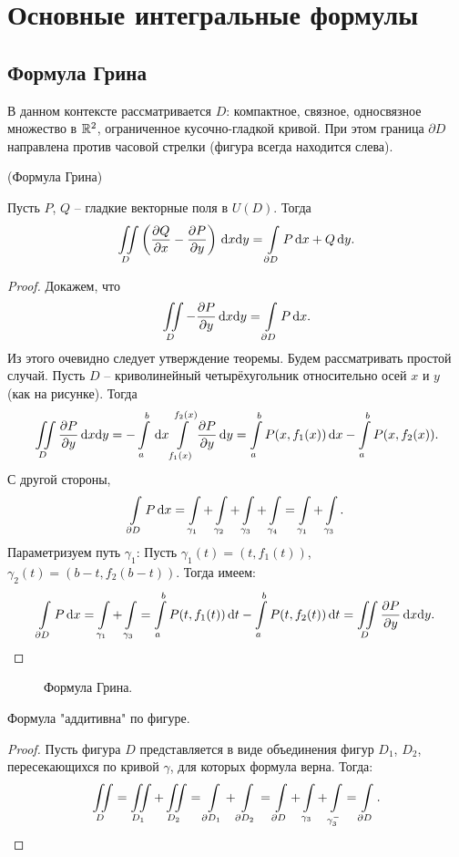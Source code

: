 \chapter{Основные интегральные формулы}
\section{Формула Грина}

\begin{remark}
     В данном контексте рассматривается $D$: компактное, связное,
     односвязное множество в $\mathbb{R}^2$, ограниченное кусочно-гладкой кривой.
     При этом граница $\partial D$ направлена против часовой стрелки 
     (фигура всегда находится слева).
\end{remark}

\begin{theorem}(Формула Грина)

    Пусть $P$, $Q$ -- гладкие векторные поля в $U(D)$. Тогда
\[
    \iint\limits_{D}{\left( \dfrac{\partial Q}{\partial x} - \dfrac{\partial P}{\partial y} \right) \,\mathrm{d} x \mathrm{d} y}
    = \int\limits_{\partial D}{P \,\mathrm{d} x + Q \,\mathrm{d} y}
.\] 
\end{theorem}
\begin{proof}
    Докажем, что 
    \[
        \iint\limits_D{-\dfrac{\partial P}{\partial y} \,\mathrm{d} x \mathrm{d} y} = \int\limits_{\partial D}{P \,\mathrm{d} x}
    .\]
    Из этого очевидно следует утверждение теоремы.
    Будем рассматривать простой случай. Пусть $D$ -- криволинейный четырёхугольник относительно
    осей $x$ и $y$ (как на рисунке). Тогда
    \[
        \iint\limits_D{\dfrac{\partial P}{\partial y} \,\mathrm{d} x \mathrm{d} y} = -\int\limits_a^b{\,\mathrm{d} x \int\limits_{f_1(x)}^{f_2(x)}
        {\dfrac{\partial P}{\partial y} \,\mathrm{d} y}} = \int\limits_a^b{P(x, f_1(x)) \,\mathrm{d} x} - \int\limits_a^b{P(x, f_2(x))}
    .\]
    С другой стороны,
    \[
        \int\limits_{\partial D}{P \,\mathrm{d} x} = \int\limits_{\gamma_1} + \int\limits_{\gamma_2} + \int\limits_{\gamma_3}
        + \int\limits_{\gamma_4} = \int\limits_{\gamma_1} + \int\limits_{\gamma_3}
    .\]
    Параметризуем путь $\gamma_1$: Пусть $\gamma_1(t) = (t, f_1(t))$, $\gamma_2(t) = (b - t, f_2(b - t))$.
    Тогда имеем:
    \[
        \int\limits_{\partial D}{P \,\mathrm{d} x} = \int\limits_{\gamma_1} + \int\limits_{\gamma_3} =
        \int\limits_a^b{P(t, f_1(t)) \,\mathrm{d} t} - \int\limits_a^b{P(t, f_2(t)) \,\mathrm{d} t} =
        \iint\limits_{D}{\dfrac{\partial P}{\partial y} \,\mathrm{d} x \mathrm{d} y}
    .\]
\end{proof}

\begin{figure}[h!]
    \centering
    \caption{Формула Грина.}
\end{figure}

\begin{remark}
    Формула "аддитивна" по фигуре.
\end{remark}
\begin{proof}
    Пусть фигура $D$ представляется в виде объединения фигур $D_1$, $D_2$, пересекающихся
    по кривой $\gamma$, для которых формула верна. Тогда:
    \[
        \iint\limits_{D} = \iint\limits_{D_1} + \iint\limits_{D_2} = \int\limits_{\partial D_1} + \int\limits_{\partial D_2} =
        \int\limits_{\partial D} + \int\limits_{\gamma_3} + \int\limits_{\gamma_3^-} = \int\limits_{\partial D}
    .\]
\end{proof}

